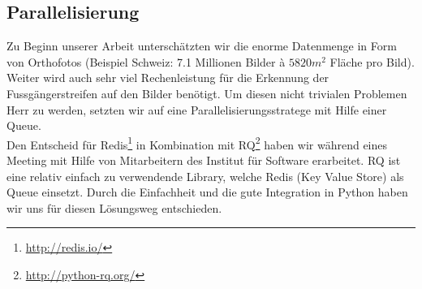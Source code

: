 \subsection{Parallelisierung}
Zu Beginn unserer Arbeit unterschätzten wir die enorme Datenmenge in Form von Orthofotos (Beispiel Schweiz: 7.1 Millionen Bilder à $5820 m^{2}$ Fläche pro Bild). Weiter wird auch sehr viel Rechenleistung für die Erkennung der Fussgängerstreifen auf den Bilder benötigt. Um diesen nicht trivialen Problemen Herr zu werden, setzten wir auf eine Parallelisierungsstratege mit Hilfe einer Queue. \\ 

Den Entscheid für Redis\footnote{\url{http://redis.io/}} in Kombination mit RQ\footnote{\url{http://python-rq.org/}} haben wir während eines Meeting mit Hilfe von Mitarbeitern des Institut für Software erarbeitet. RQ ist eine relativ einfach zu verwendende Library, welche Redis (Key Value Store) als Queue einsetzt. Durch die Einfachheit und die gute Integration in Python haben wir uns für diesen Lösungsweg entschieden.

\newpage
